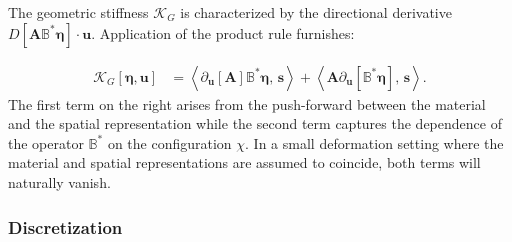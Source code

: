 \iftrue
The geometric stiffness \(\mathcal{K}_{G}\) is characterized by the directional derivative
\(D[\bm{A}\mathbb{B}^*\bm{\eta}]\cdot \bm{u}\). Application of the
product rule furnishes:

\begin{equation}
\begin{aligned}
\mathcal{K}_{G}\left[\bm{\eta},\bm{u}\right]
&= \left<\partial_{\bm{u}}\left[\bm{A}\right]\mathbb{B}^*\bm{\eta} ,\, \bm{s}\right> +  \left<\bm{A}\partial_{\bm{u}}\left[\mathbb{B}^*\bm{\eta}\right] ,\, \bm{s}\right>.
\end{aligned}
\label{eq:def-Kg}
\end{equation}
The first term on the right arises from
the push-forward between the material and the spatial representation while the
second term captures the dependence of the operator \(\mathbb{B}^*\) on the configuration \(\chi\).
In a small deformation setting where the
material and spatial representations are assumed to coincide,
both terms will naturally vanish. %
\fi

\hypertarget{sec:galerkin-discretization}{%
\subsubsection{Discretization}\label{sec:galerkin-discretization}}

